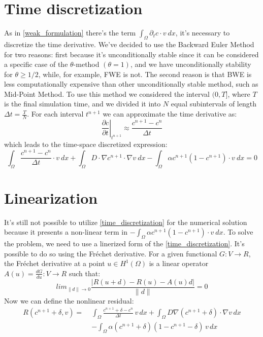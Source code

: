 \documentclass[12pt, a4paper, twoside, openright]{report}
\begin{document}
  \section{Time discretization}
  As in \autoref{weak_formulation} there's the term $\int_{\Omega} \partial_t c \cdot v \ dx$, it's necessary to discretize the time derivative.
  We've decided to use the Backward Euler Method for two reasons: first because it's unconditionally stable since it can be considered a 
  specific case of the $\theta$-method $(\theta=1)$, and we have unconditionally stability for $\theta\geq 1/2$, while, for example, FWE is not.
  The second reason is that BWE is less computationally expensive than other unconditionally stable method, such as Mid-Point Method. To use this method we considered the interval 
  $(0, T]$, where $T$ is the final simulation time, and we divided it into $N$ equal subintervals of length $\Delta t=\frac{T}{N}$. For each interval $t^{n+1}$ we can approximate the time derivative as:
  $$\left. \frac{\partial c}{\partial t} \right|_{t^{n+1}} \approx \frac{c^{n+1} - c^n}{\Delta t}$$
  which leads to the time-space discretized expression: 
  \begin{equation}
    \label{time_discretization}
    \int_{\Omega} {\frac{c^{n+1} - c^n}{\Delta t} \cdot v \ dx} + \int_{\Omega}{D \cdot \nabla c^{n+1} \cdot \nabla v \ dx} - \int_{\Omega} {\alpha c^{n+1}(1-c^{n+1}) \cdot v}\  dx = 0
  \end{equation}


  \section{Linearization}
  It's still not possible to utilize \autoref{time_discretization} for the numerical solution because it presents a non-linear term in $- \int_{\Omega} {\alpha c^{n+1}(1-c^{n+1}) \cdot v}\  dx$.
  To solve the problem, we need to use a linerized form of the \autoref{time_discretization}. It's possible to do so using the Fréchet derivative. For a given functional $G : V \rightarrow R$, the Fréchet derivative at a point $u \in H^1(\Omega)$ is a linear operator $A(u) =\frac{dG}{du}: V \rightarrow R$ such that:
  $$lim_{\|d\| \to 0} \frac{\left| R(u + d) - R(u) - A(u)d \right|}{\|d\|} = 0$$
  Now we can define the nonlinear residual:
  \begin{equation*}
  \label{residual}
  \begin{aligned}
  R(c^{n+1} + \delta, v) =\; & \int_{\Omega} \frac{c^{n+1} + \delta - c^n}{\Delta t} \, v \, dx 
  + \int_{\Omega} D \nabla (c^{n+1} + \delta) \cdot \nabla v \, dx \\
  & - \int_{\Omega} \alpha (c^{n+1} + \delta)(1 - c^{n+1} - \delta) \, v \, dx
  \end{aligned}
  \end{equation*}
\end{document}
